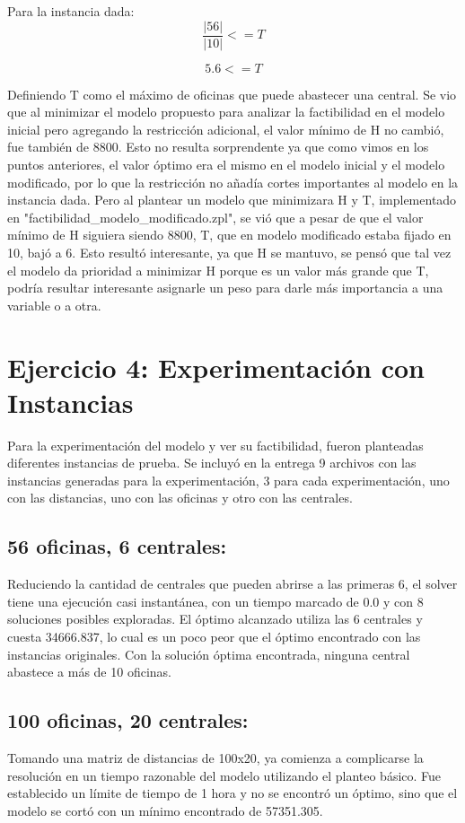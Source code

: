 \documentclass{article}
\begin{document}
Para la instancia dada:
\[
\frac{\lvert \text{56} \rvert}{\lvert \text{10} \rvert}  <= T
\]

\[
5.6 <= T
\]

Definiendo T como el máximo de oficinas que puede abastecer una central. Se vio que al minimizar el modelo propuesto para analizar la factibilidad en el modelo inicial pero agregando la restricción adicional, el valor mínimo de H no cambió, fue también de 8800. Esto no resulta sorprendente ya que como vimos en los puntos anteriores, el valor óptimo era el mismo en el modelo inicial y el modelo modificado, por lo que la restricción no añadía cortes importantes al modelo en la instancia dada. Pero al plantear un modelo que minimizara H y T, implementado en "factibilidad_modelo_modificado.zpl", se vió que a pesar de que el valor mínimo de H siguiera siendo 8800, T, que en modelo modificado estaba fijado en 10, bajó a 6. Esto resultó interesante, ya que H se mantuvo, se pensó que tal vez el modelo da prioridad a minimizar H porque es un valor más grande que T, podría resultar interesante asignarle un peso para darle más importancia a una variable o a otra. 

\section*{Ejercicio 4: Experimentación con Instancias}
Para la experimentación del modelo y ver su factibilidad, fueron planteadas diferentes instancias de prueba. Se incluyó en la entrega 9 archivos con las instancias generadas para la experimentación, 3 para cada experimentación, uno con las distancias, uno con las oficinas y otro con las centrales.

\subsection*{56 oficinas, 6 centrales:}
Reduciendo la cantidad de centrales que pueden abrirse a las primeras 6, el solver tiene una ejecución casi instantánea, con un tiempo marcado de 0.0 y con 8 soluciones posibles exploradas. El óptimo alcanzado utiliza las 6 centrales y cuesta 34666.837, lo cual es un poco peor que el óptimo encontrado con las instancias originales. Con la solución óptima encontrada, ninguna central abastece a más de 10 oficinas.

\subsection*{100 oficinas, 20 centrales:}
Tomando una matriz de distancias de 100x20, ya comienza a complicarse la resolución en un tiempo razonable del modelo utilizando el planteo básico. Fue establecido un límite de tiempo de 1 hora y no se encontró un óptimo, sino que el modelo se cortó con un mínimo encontrado de 57351.305.
\end{document}
